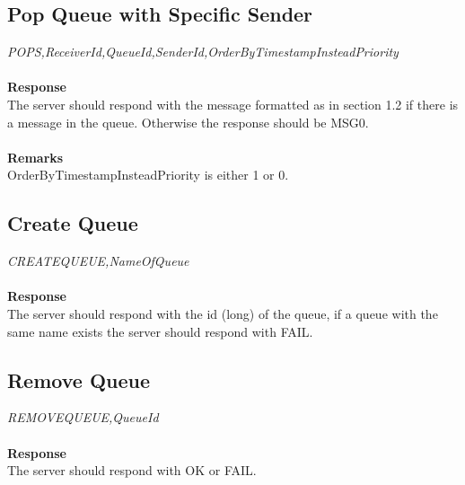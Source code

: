 \documentclass{article}
\begin{document}
            \subsection{Pop Queue with Specific Sender}
                \indent\indent\textit{POPS,ReceiverId,QueueId,SenderId,OrderByTimestampInsteadPriority}\\
                \\
                \textbf{Response}\\
                The server should respond with the message formatted as in section 1.2 if there is a message in the queue. Otherwise the response should be MSG0.\\
                \\
                \textbf{Remarks}\\
                OrderByTimestampInsteadPriority is either 1 or 0.

            \subsection{Create Queue}
                \indent\indent\textit{CREATEQUEUE,NameOfQueue}\\
                \\
                \textbf{Response}\\
                The server should respond with the id (long) of the queue, if a queue with the same name exists the server should respond with FAIL.

            \subsection{Remove Queue}
                \indent\indent\textit{REMOVEQUEUE,QueueId}\\
                \\
                \textbf{Response}\\
                The server should respond with OK or FAIL.
\end{document}

